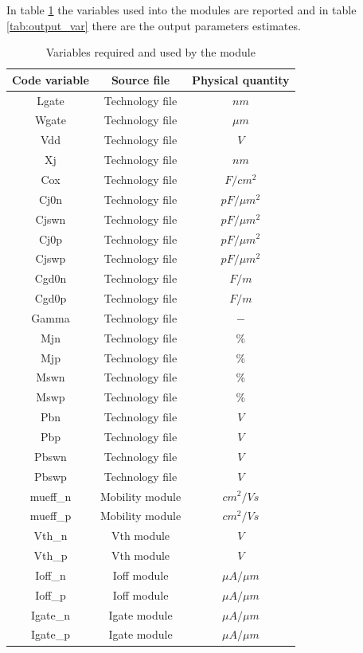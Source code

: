 \documentclass[12pt,  english, makeidx, a4paper, titlepage, oneside]{article}
\begin{document}
In table \ref{tab:input_dep} the variables  used  into the modules are reported and in table \ref{tab:output_var} there are the output parameters estimates.
\begin{table}[htbp]
	\begin{center}
		\begin{tabular}{|c|c|c|}
			\hline
			Code variable & Source file & Physical quantity\\
			\hline
			Lgate & Technology file & $nm$\\
			\hline
			Wgate & Technology file & $\mu m$\\
			\hline
			Vdd & Technology file & $V$\\
			\hline
			Xj & Technology file & $nm$\\
			\hline
			Cox & Technology file & $ F/ cm^2$\\
			\hline
			Cj0n & Technology file & $pF/\mu m^2$\\
			\hline
			Cjswn & Technology file & $pF/\mu m^2$\\
			\hline
			Cj0p & Technology file & $pF/\mu m^2$\\
			\hline
			Cjswp & Technology file & $pF/\mu m^2$\\
			\hline
			Cgd0n & Technology file & $F/m$\\
			\hline
			Cgd0p & Technology file & $F/m$\\
			\hline
			Gamma & Technology file & $-$\\
			\hline
			Mjn & Technology file & \% \\
			\hline
			Mjp & Technology file & \% \\
			\hline
			Mswn & Technology file & \% \\
			\hline
			Mswp & Technology file & \% \\
			\hline
			Pbn & Technology file & $V$ \\
			\hline
			Pbp & Technology file & $V$ \\
			\hline
			Pbswn & Technology file & $V$ \\
			\hline
			Pbswp & Technology file & $V$ \\
			\hline
			mueff\_n & Mobility module & $cm^2/Vs$\\
			\hline
			mueff\_p & Mobility module & $cm^2/Vs$\\
			\hline
			Vth\_n & Vth module & $V$\\
			\hline
			Vth\_p & Vth module & $V$\\
			\hline
			Ioff\_n & Ioff module & $\mu A/\mu m$\\
			\hline
			Ioff\_p & Ioff module & $\mu A/\mu m$\\
			\hline
			Igate\_n & Igate module & $\mu A/\mu m$\\
			\hline
			Igate\_p & Igate module & $\mu A/\mu m$\\
			\hline
		\end{tabular}
	\end{center}
	\caption{Variables required and used by the module}
	\label{tab:input_dep}
\end{table}
\end{document}
